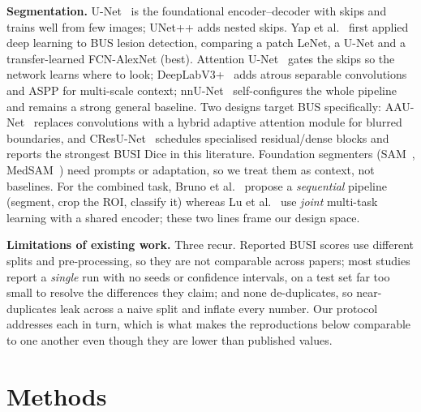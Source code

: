 \documentclass[10pt,twocolumn]{article}
\begin{document}
\textbf{Segmentation.} U-Net~\cite{ronneberger2015unet} is the foundational
encoder--decoder with skips and trains well from few images; UNet++
\cite{zhou2018unetpp} adds nested skips. Yap et al.~\cite{yap2018cnn} first applied
deep learning to BUS lesion detection, comparing a patch LeNet, a U-Net and a
transfer-learned FCN-AlexNet (best). Attention U-Net~\cite{oktay2018attentionunet}
gates the skips so the network learns where to look;
DeepLabV3+~\cite{chen2018deeplabv3plus} adds atrous separable convolutions and ASPP
for multi-scale context; nnU-Net~\cite{isensee2021nnunet} self-configures the whole
pipeline and remains a strong general baseline. Two designs target BUS
specifically: AAU-Net~\cite{chen2023aaunet} replaces convolutions with a hybrid
adaptive attention module for blurred boundaries, and
CResU-Net~\cite{derakhshandeh2024cresunet} schedules specialised residual/dense
blocks and reports the strongest BUSI Dice in this literature. Foundation
segmenters (SAM~\cite{kirillov2023sam}, MedSAM~\cite{ma2024medsam}) need prompts or
adaptation, so we treat them as context, not baselines. For the combined task,
Bruno et al.~\cite{bruno2025dualstage} propose a \emph{sequential} pipeline
(segment, crop the ROI, classify it) whereas Lu et al.~\cite{lu2025multitask} use
\emph{joint} multi-task learning with a shared encoder; these two lines frame our
design space.

\textbf{Limitations of existing work.} Three recur. Reported BUSI scores use
different splits and pre-processing, so they are not comparable across papers;
most studies report a \emph{single} run with no seeds or confidence intervals, on
a test set far too small to resolve the differences they claim; and none
de-duplicates, so near-duplicates leak across a naive split and inflate every
number. Our protocol addresses each in turn, which is what makes the reproductions
below comparable to one another even though they are lower than published values.

\section{Methods}
\end{document}

